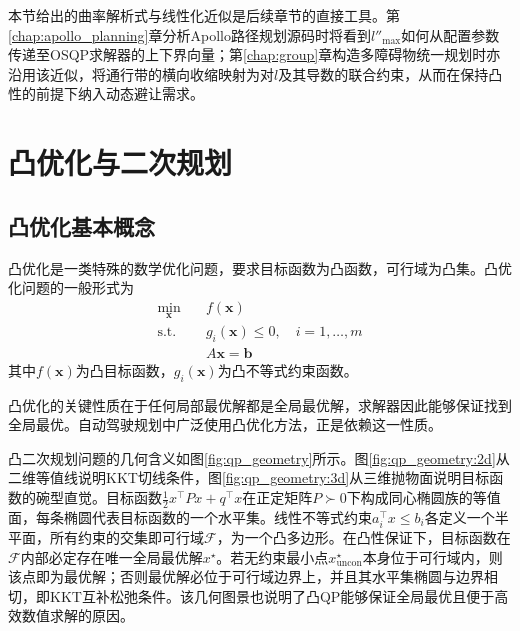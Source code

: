 本节给出的曲率解析式与线性化近似是后续章节的直接工具。第\ref{chap:apollo_planning}章分析Apollo路径规划源码时将看到$l''_{\max}$如何从配置参数传递至OSQP求解器的上下界向量；第\ref{chap:group}章构造多障碍物统一规划时亦沿用该近似，将通行带的横向收缩映射为对$l$及其导数的联合约束，从而在保持凸性的前提下纳入动态避让需求。

\section{凸优化与二次规划}

\subsection{凸优化基本概念}

凸优化是一类特殊的数学优化问题，要求目标函数为凸函数，可行域为凸集。凸优化问题的一般形式为
\begin{equation}
\begin{aligned}
\min_{\mathbf{x}} \quad & f(\mathbf{x}) \\
\text{s.t.} \quad & g_i(\mathbf{x}) \leq 0, \quad i = 1, \ldots, m \\
& A\mathbf{x} = \mathbf{b}
\end{aligned}
\label{eq:convex_opt}
\end{equation}
其中$f(\mathbf{x})$为凸目标函数，$g_i(\mathbf{x})$为凸不等式约束函数。

凸优化的关键性质在于任何局部最优解都是全局最优解，求解器因此能够保证找到全局最优。自动驾驶规划中广泛使用凸优化方法，正是依赖这一性质。

凸二次规划问题的几何含义如图\ref{fig:qp_geometry}所示。图\ref{fig:qp_geometry:2d}从二维等值线说明KKT切线条件，图\ref{fig:qp_geometry:3d}从三维抛物面说明目标函数的碗型直觉。目标函数$\frac{1}{2}x^\top P x + q^\top x$在正定矩阵$P\succ 0$下构成同心椭圆族的等值面，每条椭圆代表目标函数的一个水平集。线性不等式约束$a_i^\top x\leq b_i$各定义一个半平面，所有约束的交集即可行域$\mathcal{F}$，为一个凸多边形。在凸性保证下，目标函数在$\mathcal{F}$内部必定存在唯一全局最优解$x^\star$。若无约束最小点$x^\star_\text{uncon}$本身位于可行域内，则该点即为最优解；否则最优解必位于可行域边界上，并且其水平集椭圆与边界相切，即KKT互补松弛条件。该几何图景也说明了凸QP能够保证全局最优且便于高效数值求解的原因。

